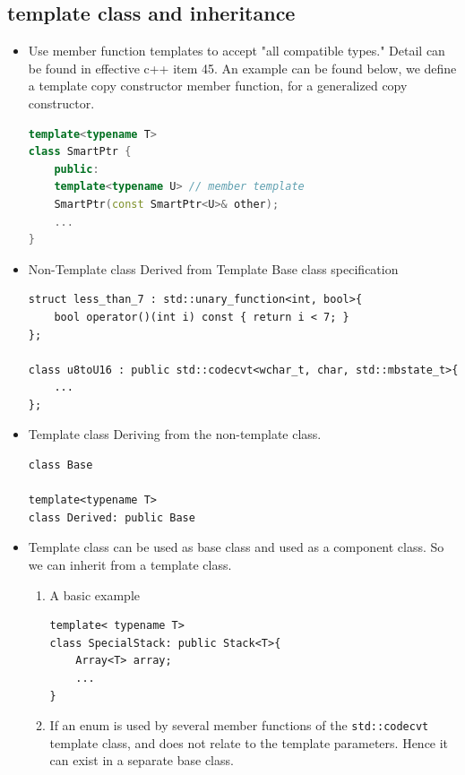 \documentclass[a4paper,11pt,twoside]{book}
\begin{document}
\subsection{template class and inheritance}
\begin{itemize}
	
	\item Use member function templates to accept "all compatible types." Detail can be found in effective c++ item 45. An example can be found below, we define a template copy constructor member function, for a generalized copy constructor.
	
\begin{lstlisting}[frame=single, language=c++]
template<typename T>
class SmartPtr {
	public:
	template<typename U> // member template
	SmartPtr(const SmartPtr<U>& other); 
	...
}		
\end{lstlisting}		
	
	\item Non-Template class Derived from Template Base class specification
\begin{lstlisting}[numbers=none]
struct less_than_7 : std::unary_function<int, bool>{
	bool operator()(int i) const { return i < 7; }
};

class u8toU16 : public std::codecvt<wchar_t, char, std::mbstate_t>{
	...
};	
\end{lstlisting}	
	
	\item Template class Deriving from the non-template class.
\begin{lstlisting}[numbers=none]
class Base

template<typename T>
class Derived: public Base	
\end{lstlisting}		
	
	\item Template class can be used as base class and used as a component class. So we can inherit from a template class.
	\begin{enumerate}
		\item A basic example
\begin{lstlisting}[numbers=none]
template< typename T>
class SpecialStack: public Stack<T>{
	Array<T> array;
	...
}	
\end{lstlisting}			
		
		\item If an enum is used by several member functions of the \texttt{std::codecvt} template class, and does not relate to the template parameters. Hence it can exist in a separate base class.
		

\end{enumerate}
\end{itemize}
\end{document}
